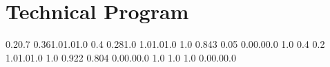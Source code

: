 \titleformat{\chapter}{\bf \huge}{\thechapter}{1cm}{}
\chapter{Technical Program}
\vspace{-15mm}


  {0.2}{0.7} {0.36}{1.0}{1.0}{1.0}
   {0.4} {0.28}{1.0} {1.0}{1.0}{1.0}
      {1.0} {0.843} {0.05} {0.0}{0.0}{0.0}
 {1.0} {0.4} {0.2} {1.0}{1.0}{1.0}
   {1.0} {0.922} {0.804} {0.0}{0.0}{0.0}
   {1.0} {1.0} {1.0} {0.0}{0.0}{0.0}


\newcommand{\WorkshopsSchedule}[2]{
  \event #1 {0900} {1030} {09:00\\\vspace{0.2em}Workshops #2}        {90~min}                {Wheeler Hall}                   {workshop}
  \event #1 {1030} {1100} {10:30 Break}                              {\vspace{1.5mm}30 min}  {Wheeler Hall}     {break}
  \event #1 {1100} {1230} {11:00\\\vspace{0.2em}Workshops #2}        {90~min}                {Wheeler Hall}                   {workshop}
  \event #1 {1400} {1530} {14:00\\\vspace{0.2em}Workshops #2}        {90~min}                {Wheeler Hall}                   {workshop}
  \event #1 {1530} {1600} {15:30 Break}                              {\vspace{1.5mm}30 min}  {Wheeler Hall}     {break}
  \event #1 {1600} {1730} {16:00\\\vspace{0.2em}Workshops #2}        {90~min}                {Wheeler Hall}                   {workshop}
}


